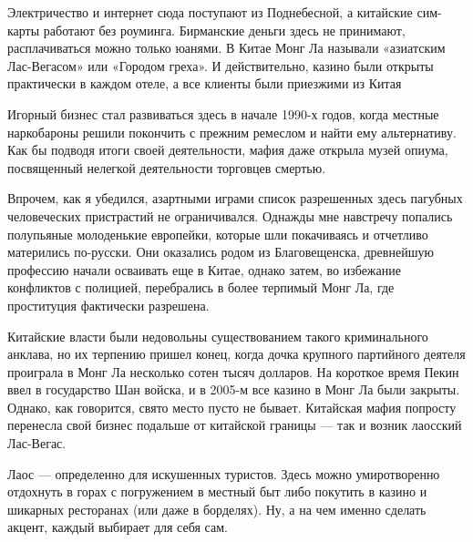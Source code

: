 \begin{fancyquotes}
    Электричество и интернет сюда поступают из Поднебесной, а китайские сим-карты работают без роуминга. Бирманские деньги здесь не принимают, расплачиваться можно только юанями. В Китае Монг Ла называли «азиатским Лас-Вегасом» или «Городом греха». И действительно, казино были открыты практически в каждом отеле, а все клиенты были приезжими из Китая
\end{fancyquotes}

Игорный бизнес стал развиваться здесь в начале 1990-х годов, когда местные наркобароны решили покончить с прежним ремеслом и найти ему альтернативу. Как бы подводя итоги своей деятельности, мафия даже открыла музей опиума, посвященный нелегкой деятельности торговцев смертью.

Впрочем, как я убедился, азартными играми список разрешенных здесь пагубных человеческих пристрастий не ограничивался. Однажды мне навстречу попались полупьяные молоденькие европейки, которые шли покачиваясь и отчетливо матерились по-русски. Они оказались родом из Благовещенска, древнейшую профессию начали осваивать еще в Китае, однако затем, во избежание конфликтов с полицией, перебрались в более терпимый Монг Ла, где проституция фактически разрешена.

Китайские власти были недовольны существованием такого криминального анклава, но их терпению пришел конец, когда дочка крупного партийного деятеля проиграла в Монг Ла несколько сотен тысяч долларов. На короткое время Пекин ввел в государство Шан войска, и в 2005-м все казино в Монг Ла были закрыты. Однако, как говорится, свято место пусто не бывает. Китайская мафия попросту перенесла свой бизнес подальше от китайской границы — так и возник лаосский Лас-Вегас.

Лаос — определенно для искушенных туристов. Здесь можно умиротворенно отдохнуть в горах с погружением в местный быт либо покутить в казино и шикарных ресторанах (или даже в борделях). Ну, а на чем именно сделать акцент, каждый выбирает для себя сам.